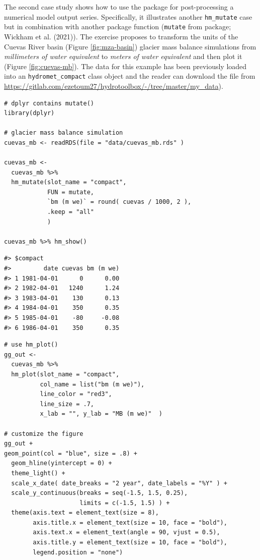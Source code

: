 The second case study shows how to use the package for post-processing a
numerical model output series. Specifically, it illustrates another
\texttt{hm\_mutate} case but in combination with another package function
(\texttt{mutate} from  package; Wickham et al. (2021)). The exercise
proposes to transform the units of the Cuevas River basin
(Figure \ref{fig:mza-basin}) glacier mass balance simulations
from \emph{millimeters of water equivalent} to \emph{meters of water equivalent}
and then plot it (Figure \ref{fig:cuevas-mb}). The
data for this example has been previously loaded into an
\texttt{hydromet\_compact} class object and the reader can download
the file from \url{https://gitlab.com/ezetoum27/hydrotoolbox/-/tree/master/my_data}).

\begin{verbatim}
# dplyr contains mutate()
library(dplyr) 

# glacier mass balance simulation
cuevas_mb <- readRDS(file = "data/cuevas_mb.rds" )

cuevas_mb <- 
  cuevas_mb %>%
  hm_mutate(slot_name = "compact",
            FUN = mutate, 
            `bm (m we)` = round( cuevas / 1000, 2 ),
            .keep = "all"
            ) 

cuevas_mb %>% hm_show()
\end{verbatim}

\begin{verbatim}
#> $compact
#>         date cuevas bm (m we)
#> 1 1981-04-01      0      0.00
#> 2 1982-04-01   1240      1.24
#> 3 1983-04-01    130      0.13
#> 4 1984-04-01    350      0.35
#> 5 1985-04-01    -80     -0.08
#> 6 1986-04-01    350      0.35
\end{verbatim}

\begin{verbatim}
# use hm_plot()
gg_out <- 
  cuevas_mb %>% 
  hm_plot(slot_name = "compact", 
          col_name = list("bm (m we)"), 
          line_color = "red3", 
          line_size = .7, 
          x_lab = "", y_lab = "MB (m we)"  )
  
# customize the figure
gg_out + 
geom_point(col = "blue", size = .8) +
  geom_hline(yintercept = 0) +
  theme_light() + 
  scale_x_date( date_breaks = "2 year", date_labels = "%Y" ) +
  scale_y_continuous(breaks = seq(-1.5, 1.5, 0.25),
                     limits = c(-1.5, 1.5) ) +
  theme(axis.text = element_text(size = 8),
        axis.title.x = element_text(size = 10, face = "bold"),
        axis.text.x = element_text(angle = 90, vjust = 0.5),
        axis.title.y = element_text(size = 10, face = "bold"), 
        legend.position = "none") 
\end{verbatim}

